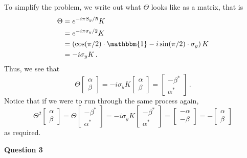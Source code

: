 \documentclass[10pt]{article}
\begin{document}
To simplify the problem, we write out what $\Theta$ looks like as a matrix, that is
\begin{equation*}
  \begin{split}
    \Theta & = e^{-i\pi S_{y}/\hbar}K \\
    & = e^{-i\pi\sigma_{y}/2}K \\
    & = \left(\cos(\pi/2) \cdot \mathbbm{1} - i\sin(\pi/2)\cdot \sigma_{y}\right)K \\
    & = -i\sigma_{y}K \, .\\
  \end{split}
\end{equation*}
Thus, we see that
\[
\Theta
\begin{bmatrix}
  \alpha \\
  \beta
\end{bmatrix}
= -i\sigma_{y}K
\begin{bmatrix}
  \alpha \\
  \beta
\end{bmatrix}
=
\begin{bmatrix}
  -\beta^{*} \\
  \alpha^{*}
\end{bmatrix}
\, .\]
Notice that if we were to run through the same process again,
\[
\Theta^{2}
\begin{bmatrix}
  \alpha \\
  \beta
\end{bmatrix}
= \Theta
\begin{bmatrix}
  -\beta^{*} \\
  \alpha^{*}
\end{bmatrix}
= -i\sigma_{y}K
\begin{bmatrix}
  -\beta^{*} \\
  \alpha^{*}
\end{bmatrix}
=
\begin{bmatrix}
  -\alpha \\
  -\beta
\end{bmatrix}
= -
\begin{bmatrix}
  \alpha \\
  \beta
\end{bmatrix}
\]
as required.

\textbf{Question 3}
\end{document}
